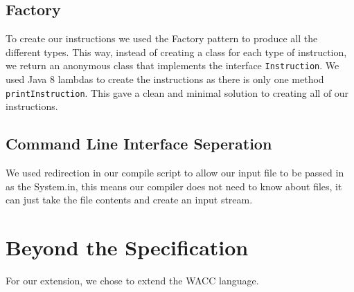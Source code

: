 \documentclass[11pt,a4paper]{article}
\begin{document}
\subsection{Factory}
\label{sub:Factory}
To create our instructions we used the Factory pattern to produce all the different types. This way, instead of creating a class for each type of instruction, we return an anonymous class that implements the interface \texttt{Instruction}. We used Java 8 lambdas to create the instructions as there is only one method \texttt{printInstruction}. This gave a clean and minimal solution to creating all of our instructions.

\subsection{Command Line Interface Seperation}
\label{sub:Command Line Interface Seperation}
We used redirection in our compile script to allow our input file to be passed in as the System.in, this means our compiler does not need to know about files, it can just take the file contents and create an input stream.

\section{Beyond the Specification}
\label{sec:Beyond the Specification}
For our extension, we chose to extend the WACC language. 
\end{document}
